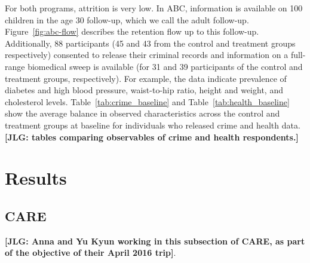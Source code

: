 For both programs, attrition is very low. In ABC, information is available on 100 children in the age 30 follow-up, which we call the adult follow-up. Figure~\ref{fig:abc-flow} describes the retention flow up to this follow-up. Additionally, 88 participants (45 and 43 from the control and treatment groups respectively) consented to release their criminal records and information on a full-range biomedical sweep is available (for 31 and 39 participants of the control and treatment groups, respectively). For example, the data indicate prevalence of diabetes and high blood pressure, waist-to-hip ratio, height and weight, and cholesterol levels. Table~\ref{tab:crime_baseline} and Table~\ref{tab:health_baseline} show the average balance in observed characteristics across the control and treatment groups at  baseline for individuals who released crime and health data.\\

\noindent \textbf{[JLG: tables comparing observables of crime and health respondents.]}

\begin{center}
	
\end{center}

\begin{center}
	
\end{center}


\section{Results}

\subsection{CARE}

\noindent \textbf{[JLG: Anna and Yu Kyun working in this subsection of CARE, as part of the objective of their April 2016 trip]}.

\renewcommand{\refname}{Appendix References}
\clearpage
\singlespace



 